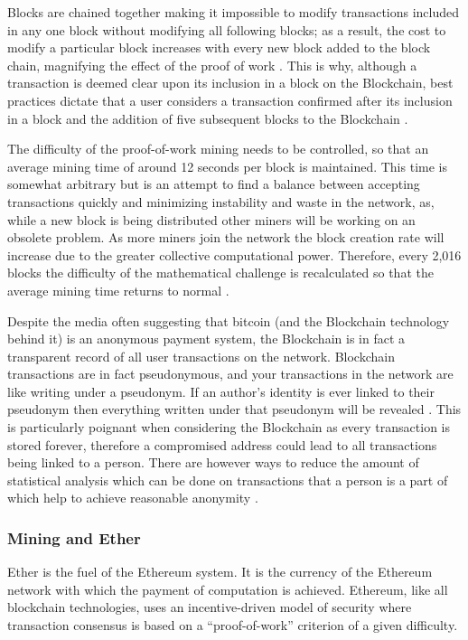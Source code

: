 \documentclass{article}
\begin{document}
Blocks are chained together making it impossible to modify transactions included in any one block without modifying all following blocks; as a result, the cost to modify a particular block increases with every new block added to the block chain, magnifying the effect of the proof of work \citep{20_developer_guide_bitcoin_2016}\citep{38_proof_of_work_-_masterpage_2016}. This is why, although a transaction is deemed clear upon its inclusion in a block on the Blockchain, best practices dictate that a user considers a transaction confirmed after its inclusion in a block and the addition of five subsequent blocks to the Blockchain \citep{27_confirmation_-_bitcoin_wiki_2016}.

The difficulty of the proof-of-work mining needs to be controlled, so that an average mining time of around 12 seconds per block is maintained. This time is somewhat arbitrary but is an attempt to find a balance between accepting transactions quickly and minimizing instability and waste in the network, as, while a new block is being distributed other miners will be working on an obsolete problem. As more miners join the network the block creation rate will increase due to the greater collective computational power. Therefore, every 2,016 blocks the difficulty of the mathematical challenge is recalculated so that the average mining time returns to normal \citep{20_developer_guide_bitcoin_2016}\citep{26_blockchain_mining_-_distributed_ledgers_and_blockchain_technology_2016}.

Despite the media often suggesting that bitcoin (and the Blockchain technology behind it) is an anonymous payment system, the Blockchain is in fact a transparent record of all user transactions on the network. Blockchain transactions are in fact pseudonymous, and your transactions in the network are like writing under a pseudonym. If an author's identity is ever linked to their pseudonym then everything written under that pseudonym will be revealed \citep{28_anonymity_2016}. This is particularly poignant when considering the Blockchain as every transaction is stored forever, therefore a compromised address could lead to all transactions being linked to a person. There are however ways to reduce the amount of statistical analysis which can be done on transactions that a person is a part of which help to achieve reasonable anonymity \citep{76_chan_liu_xeu_2013}.

\subsubsection{Mining and Ether}
Ether is the fuel of the Ethereum system. It is the currency of the Ethereum network with which the payment of computation is achieved. Ethereum, like all blockchain technologies, uses an incentive-driven model of security where transaction consensus is based on a ``proof-of-work'' criterion of a given difficulty.
\end{document}
